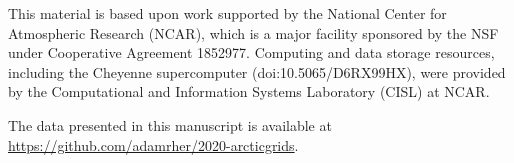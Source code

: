 \documentclass[draft]{agujournal2019}
\begin{document}
%




%
%
%
%
%
%
%
%


\acknowledgments
This material is based upon work supported by the National Center for Atmospheric Research (NCAR), which is a major facility sponsored by the NSF under Cooperative Agreement 1852977. Computing and data storage resources, including the Cheyenne supercomputer
(doi:10.5065/D6RX99HX), were provided by the Computational and Information Systems Laboratory (CISL) at NCAR.

The data presented in this manuscript is available at {\url{https://github.com/adamrher/2020-arcticgrids}}.




%
%

%



%
%
%
%
%
\end{document}
